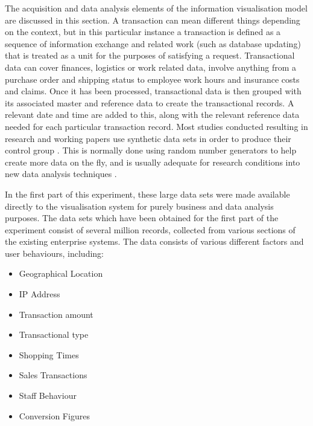 The acquisition and data analysis elements of the information visualisation model are discussed in this section. A transaction can mean different things depending on the context, but in this particular instance a transaction is defined as a sequence of information exchange and related work (such as database updating) that is treated as a unit for the purposes of satisfying a request\cite{williamson1979transaction}. Transactional data can cover finances, logistics or work related data, involve anything from a purchase order and shipping status to employee work hours and insurance costs and claims. Once it has been processed, transactional data is then grouped with its associated master and reference data to create the transactional records. A relevant date and time are added to this, along with the relevant reference data needed for each particular transaction record. Most studies conducted resulting in research and working papers use synthetic data sets in order to produce their control group \cite{axelsson2000generation}. This is normally done using random number generators to help create more data on the fly, and is usually adequate for research conditions into new data analysis techniques \cite{council2005transaction}.

In the first part of this experiment, these large data sets were made available directly to the visualisation system for purely business and data analysis purposes. The data sets which have been obtained for the first part of the experiment consist of several million records, collected from various sections of the existing enterprise systems. The data consists of various different factors and user behaviours, including:

\begin{itemize}
\item Geographical Location
\item IP Address
\item Transaction amount
\item Transactional type
\item Shopping Times
\item Sales Transactions   
\item Staff Behaviour
\item Conversion Figures 
\end{itemize}

